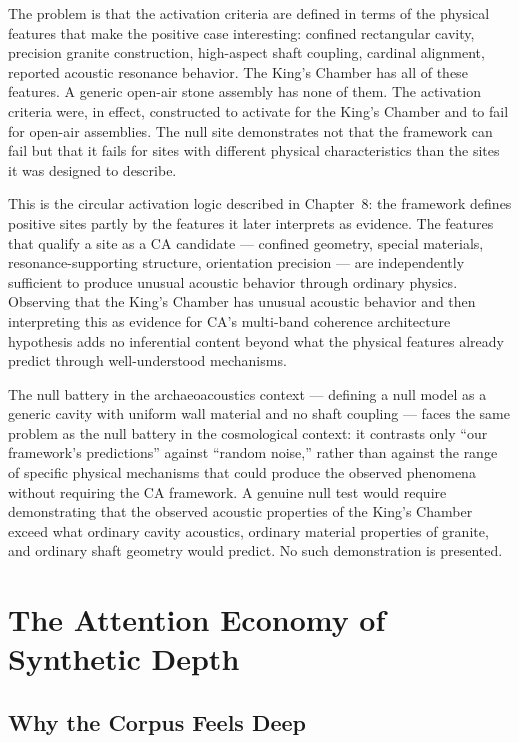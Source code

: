 \documentclass[12pt, openright, twoside]{book}
\begin{document}
The problem is that the activation criteria are defined in terms of the physical
features that make the positive case interesting: confined rectangular cavity,
precision granite construction, high-aspect shaft coupling, cardinal alignment,
reported acoustic resonance behavior. The King's Chamber has all of these
features. A generic open-air stone assembly has none of them. The activation
criteria were, in effect, constructed to activate for the King's Chamber and
to fail for open-air assemblies. The null site demonstrates not that the
framework can fail but that it fails for sites with different physical
characteristics than the sites it was designed to describe.

This is the circular activation logic described in Chapter~8: the framework
defines positive sites partly by the features it later interprets as evidence.
The features that qualify a site as a CA candidate --- confined geometry,
special materials, resonance-supporting structure, orientation precision ---
are independently sufficient to produce unusual acoustic behavior through
ordinary physics. Observing that the King's Chamber has unusual acoustic
behavior and then interpreting this as evidence for CA's multi-band coherence
architecture hypothesis adds no inferential content beyond what the physical
features already predict through well-understood mechanisms.

The null battery in the archaeoacoustics context --- defining a null model as
a generic cavity with uniform wall material and no shaft coupling --- faces
the same problem as the null battery in the cosmological context: it contrasts
only ``our framework's predictions'' against ``random noise,'' rather than
against the range of specific physical mechanisms that could produce the
observed phenomena without requiring the CA framework. A genuine null test
would require demonstrating that the observed acoustic properties of the
King's Chamber exceed what ordinary cavity acoustics, ordinary material
properties of granite, and ordinary shaft geometry would predict. No such
demonstration is presented.

\chapter{The Attention Economy of Synthetic Depth}

\section{Why the Corpus Feels Deep}
\end{document}
